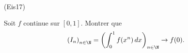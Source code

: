 \begin{tiny}(Eis17)\end{tiny} 
Soit $f$ continue sur $[0,1]$. Montrer que
\begin{displaymath}
 \left(I_n\right) _{n\in \N} = \left( \int_{0}^{1}f(x^n)\,dx\right) _{n\in \N}\rightarrow f(0).
\end{displaymath}
